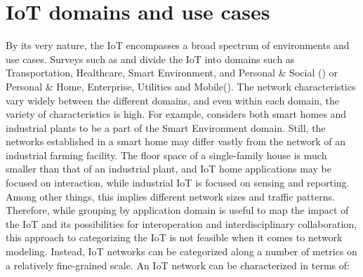 \documentclass{acm_proc_article-sp}
\begin{document}
\section{IoT domains and use cases}
\label{sec:Scenarios}
By its very nature, the IoT encompasses a broad spectrum of environments and use cases.
Surveys such as \cite{IoT_survey_Atzori} and \cite{IoT_survey_Gubbi} divide the IoT into domains such as Transportation, Healthcare, Smart Environment, and Personal \& Social (\cite{IoT_survey_Atzori}) or Personal \& Home, Enterprise, Utilities and Mobile(\cite{IoT_survey_Gubbi}).
The network characteristics vary widely between the different domains, and even within each domain, the variety of characteristics is high. For example,\cite{IoT_survey_Atzori} considers both smart homes and industrial plants to be a part of the Smart Environment domain. Still, the networks established in a smart home may differ vastly from the network of an industrial farming facility. The floor space of a single-family house is much smaller than that of an industrial plant, and IoT home applications may be focused on interaction, while industrial IoT is focused on sensing and reporting.
Among other things, this implies different network sizes and traffic patterns.\\
Therefore, while grouping by application domain is useful to map the impact of the IoT and its possibilities for interoperation and interdisciplinary collaboration, this approach to categorizing the IoT is not feasible when it comes to network modeling. Instead, IoT networks can be categorized along a number of metrics on a relatively fine-grained scale. An IoT network can be characterized in terms of:\\
\end{document}
